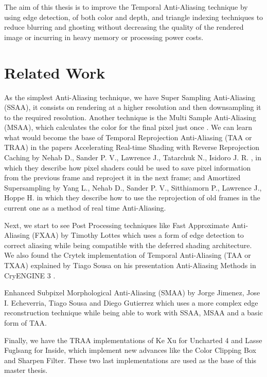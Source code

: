 \documentclass{cslthse-msc}
\begin{document}
The aim of this thesis is to improve the Temporal Anti-Aliasing technique by using edge detection, of both color and depth, and triangle indexing techniques to reduce blurring and ghosting without decreasing the quality of the rendered image or incurring in heavy memory or processing power costs.  


\section{Related Work}
As the simplest Anti-Aliasing technique, we have Super Sampling Anti-Aliasing (SSAA), it consists on rendering at a higher resolution and then downsampling it to the required resolution. Another technique is the Multi Sample Anti-Aliasing (MSAA), which calculates the color for the final pixel just once \cite{Doggett2017EDAN35}.  We can learn what would become the base of Temporal Reprojection Anti-Aliasing (TAA or TRAA) in the papers Accelerating Real-time Shading with Reverse Reprojection Caching  by Nehab D., Sander P. V., Lawrence J., Tatarchuk N., Isidoro J. R. \cite{Nehab2007}, in which they describe how pixel shaders could be used to save pixel information from the previous frame and reproject it in the next frame; and Amortized Supersampling by Yang L., Nehab D., Sander P. V., Sitthiamorn P., Lawrence J., Hoppe H. \cite{Yang2009} in which they describe how to use the reprojection of old frames in the current one as a method of real time Anti-Aliasing.

Next, we start to see Post Processing techniques like Fast Approximate Anti-Aliasing (FXAA) by Timothy Lottes \cite{Lottes2009} which uses a form of edge detection to correct aliasing while being compatible with the deferred shading architecture. We also found the Crytek implementation of Temporal Anti-Aliasing (TAA or TXAA) explained by Tiago Sousa on his presentation Anti-Aliasing Methods in CryENGINE 3 \cite{JIMENEZ2011_SIGGRAPH11}.

Enhanced Subpixel Morphological Anti-Aliasing (SMAA) by Jorge Jimenez, Jose I. Echeverria, Tiago Sousa and Diego Gutierrez \cite{Jimenez2012} which uses a more complex edge reconstruction technique while being able to work with SSAA, MSAA and a basic form of TAA.
 
Finally, we have the TRAA implementations of Ke Xu for Uncharted 4 and Lasse Fuglsang for Inside, which implement new advances like the Color Clipping Box and Sharpen Filter. These two last implementations are used as the base of this master thesis. \cite{Fuglsand2016, XU2016} 
\end{document}
